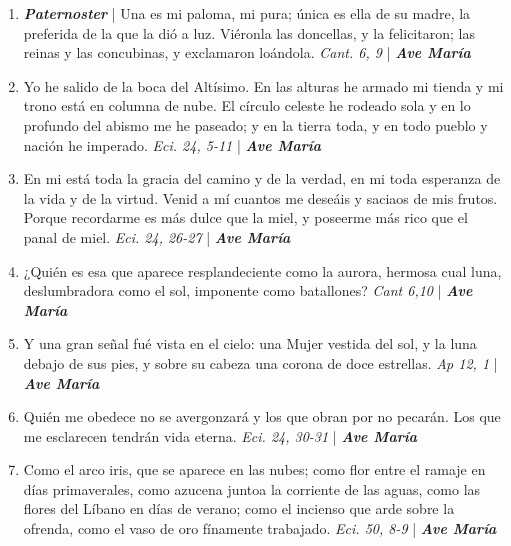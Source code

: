 \documentclass[../../devocionario.tex]{subfiles}
\begin{document}
    \begin{enumerate}
    
        \item \textbf{\textit{Paternoster}} | Una es mi paloma, mi pura; única es ella de su madre, 
            la preferida de la que la dió a luz. Viéronla las doncellas, 
            y la felicitaron; las reinas y las concubinas, y exclamaron loándola. \textit{Cant. 6, 9} | \textbf{\textit{Ave María}}

        \item Yo he salido de la boca del Altísimo. En las alturas he armado mi tienda y mi 
            trono está en columna de nube. El círculo celeste he rodeado sola y en lo profundo 
            del abismo me he paseado; y en la tierra toda, y en todo pueblo y nación he imperado. 
            \textit{Eci. 24, 5-11} | \textbf{\textit{Ave María}}

        \item En mi está toda la gracia del camino y de la verdad, en mi toda esperanza de la vida 
            y de la virtud. Venid a mí cuantos me deseáis y saciaos de mis frutos. Porque recordarme 
            es más dulce que la miel, y poseerme más rico que el panal de miel. \textit{Eci. 24, 26-27} | \textbf{\textit{Ave María}}

        \item ¿Quién es esa que aparece resplandeciente como la aurora, hermosa cual luna, deslumbradora como el sol, 
            imponente como batallones? \textit{Cant 6,10} | \textbf{\textit{Ave María}}

        \item Y una gran señal fué vista en el cielo: una Mujer vestida del sol, y la luna debajo de sus pies, 
            y sobre su cabeza una corona de doce estrellas. \textit{Ap 12, 1} | \textbf{\textit{Ave María}}

        \item Quién me obedece no se avergonzará y los que obran por no pecarán. Los que me 
            esclarecen tendrán vida eterna. \textit{Eci. 24, 30-31} | \textbf{\textit{Ave María}}

        \item Como el arco iris, que se aparece en las nubes; como flor entre el ramaje en 
            días primaverales, como azucena juntoa la corriente de las aguas, como las flores 
            del Líbano en días de verano; como el incienso que arde sobre la ofrenda, como el 
            vaso de oro fínamente trabajado. \textit{Eci. 50, 8-9} | \textbf{\textit{Ave María}}


\end{enumerate}
\end{document}
